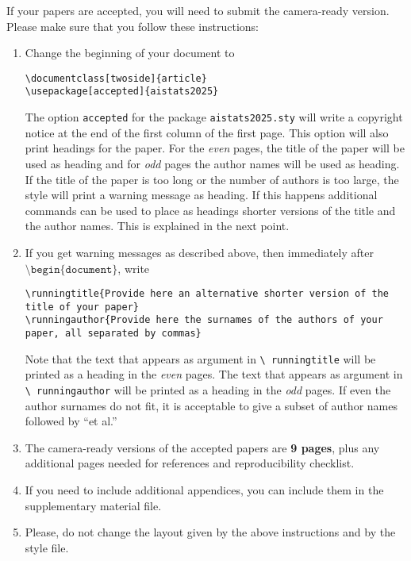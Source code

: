 \documentclass[twoside]{article}
\begin{document}
If your papers are accepted, you will need to submit the camera-ready version. Please make sure that you follow these instructions:
\begin{enumerate}
    \item Change the beginning of your document to
    \begin{flushleft}
    \texttt{\textbackslash documentclass[twoside]\{article\}}\\
    \texttt{\textbackslash usepackage[accepted]\{aistats2025\}}
    \end{flushleft}
    The option \texttt{accepted} for the package
    \texttt{aistats2025.sty} will write a copyright notice at the end of
    the first column of the first page. This option will also print
    headings for the paper.  For the \emph{even} pages, the title of
    the paper will be used as heading and for \emph{odd} pages the
    author names will be used as heading.  If the title of the paper
    is too long or the number of authors is too large, the style will
    print a warning message as heading. If this happens additional
    commands can be used to place as headings shorter versions of the
    title and the author names. This is explained in the next point.
    \item  If you get warning messages as described above, then
    immediately after $\texttt{\textbackslash
    begin\{document\}}$, write
    \begin{flushleft}
    \texttt{\textbackslash runningtitle\{Provide here an alternative
    shorter version of the title of your paper\}}\\
    \texttt{\textbackslash runningauthor\{Provide here the surnames of
    the authors of your paper, all separated by commas\}}
    \end{flushleft}
    Note that the text that appears as argument in \texttt{\textbackslash
      runningtitle} will be printed as a heading in the \emph{even}
    pages. The text that appears as argument in \texttt{\textbackslash
      runningauthor} will be printed as a heading in the \emph{odd}
    pages.  If even the author surnames do not fit, it is acceptable
    to give a subset of author names followed by ``et al.''


    \item The camera-ready versions of the accepted papers are \textbf{9
      pages}, plus any additional pages needed for references and reproducibility checklist.

    \item If you need to include additional appendices,
      you can include them in the supplementary
      material file.

    \item Please, do not change the layout given by the above
      instructions and by the style file.

\end{enumerate}
\end{document}
